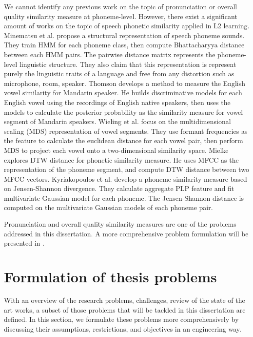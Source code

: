 We cannot identify any previous work on the topic of pronunciation or overall quality similarity measure at phoneme-level. However, there exist a significant amount of works on the topic of speech phonetic similarity applied in L2 learning. Minematsu et al. \cite{Minematsu2004, Minematsu2007, Shiozawa2016} propose a structural representation of speech phoneme sounds. They train HMM for each phoneme class, then compute Bhattacharyya distance between each HMM pairs. The pairwise distance matrix represents the phoneme-level linguistic structure. They also claim that this representation is represent purely the linguistic traits of a language and free from any distortion such as microphone, room, speaker. Thomson \cite{Thomson2008} develops a method to measure the English vowel similarity for Mandarin speaker. He builds discriminative models for each English vowel using the recordings of English native speakers, then uses the models to calculate the posterior probability as the similarity measure for vowel segment of Mandarin speakers. Wieling et al. \cite{Wieling2011} focus on the multidimensional scaling (MDS) representation of vowel segments. They use formant frequencies as the feature to calculate the euclidean distance for each vowel pair, then perform MDS to project each vowel onto a two-dimensional similarity space. Mielke \cite{Mielke2012} explores DTW distance for phonetic similarity measure. He uses MFCC as the representation of the phoneme segment, and compute DTW distance between two MFCC vectors. Kyriakopoulos et al. \cite{Kyriakopoulos2017} develop a phoneme similarity measure based on Jensen-Shannon divergence. They calculate aggregate PLP feature and fit multivariate Gaussian model for each phoneme. The Jensen-Shannon distance is computed on the multivariate Gaussian models of each phoneme pair.

Pronunciation and overall quality similarity measures are one of the problems addressed in this dissertation. A more comprehensive problem formulation will be presented in .

\section{Formulation of thesis problems}

With an overview of the research problems, challenges, review of the state of the art works, a subset of those problems that will be tackled in this dissertation are defined. In this section, we formulate these problems more comprehensively by discussing their assumptions, restrictions, and objectives in an engineering way.

